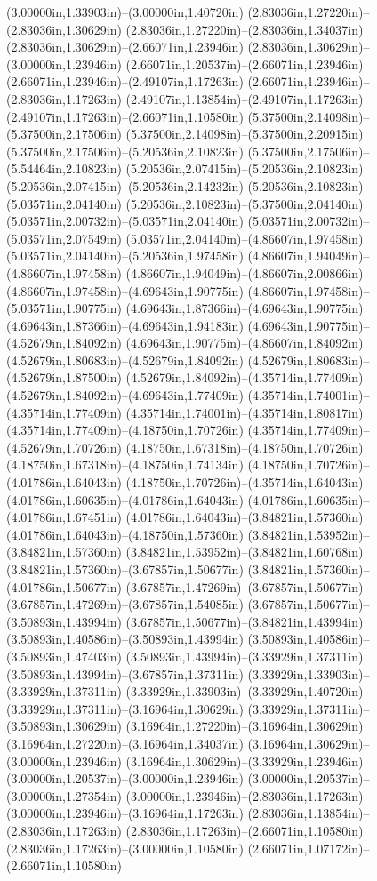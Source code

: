 (3.00000in,1.33903in)--(3.00000in,1.40720in) (2.83036in,1.27220in)--(2.83036in,1.30629in) (2.83036in,1.27220in)--(2.83036in,1.34037in) (2.83036in,1.30629in)--(2.66071in,1.23946in) (2.83036in,1.30629in)--(3.00000in,1.23946in) (2.66071in,1.20537in)--(2.66071in,1.23946in) (2.66071in,1.23946in)--(2.49107in,1.17263in) (2.66071in,1.23946in)--(2.83036in,1.17263in) (2.49107in,1.13854in)--(2.49107in,1.17263in) (2.49107in,1.17263in)--(2.66071in,1.10580in) (5.37500in,2.14098in)--(5.37500in,2.17506in) (5.37500in,2.14098in)--(5.37500in,2.20915in) (5.37500in,2.17506in)--(5.20536in,2.10823in) (5.37500in,2.17506in)--(5.54464in,2.10823in) (5.20536in,2.07415in)--(5.20536in,2.10823in) (5.20536in,2.07415in)--(5.20536in,2.14232in) (5.20536in,2.10823in)--(5.03571in,2.04140in) (5.20536in,2.10823in)--(5.37500in,2.04140in) (5.03571in,2.00732in)--(5.03571in,2.04140in) (5.03571in,2.00732in)--(5.03571in,2.07549in) (5.03571in,2.04140in)--(4.86607in,1.97458in) (5.03571in,2.04140in)--(5.20536in,1.97458in) (4.86607in,1.94049in)--(4.86607in,1.97458in) (4.86607in,1.94049in)--(4.86607in,2.00866in) (4.86607in,1.97458in)--(4.69643in,1.90775in) (4.86607in,1.97458in)--(5.03571in,1.90775in) (4.69643in,1.87366in)--(4.69643in,1.90775in) (4.69643in,1.87366in)--(4.69643in,1.94183in) (4.69643in,1.90775in)--(4.52679in,1.84092in) (4.69643in,1.90775in)--(4.86607in,1.84092in) (4.52679in,1.80683in)--(4.52679in,1.84092in) (4.52679in,1.80683in)--(4.52679in,1.87500in) (4.52679in,1.84092in)--(4.35714in,1.77409in) (4.52679in,1.84092in)--(4.69643in,1.77409in) (4.35714in,1.74001in)--(4.35714in,1.77409in) (4.35714in,1.74001in)--(4.35714in,1.80817in) (4.35714in,1.77409in)--(4.18750in,1.70726in) (4.35714in,1.77409in)--(4.52679in,1.70726in) (4.18750in,1.67318in)--(4.18750in,1.70726in) (4.18750in,1.67318in)--(4.18750in,1.74134in) (4.18750in,1.70726in)--(4.01786in,1.64043in) (4.18750in,1.70726in)--(4.35714in,1.64043in) (4.01786in,1.60635in)--(4.01786in,1.64043in) (4.01786in,1.60635in)--(4.01786in,1.67451in) (4.01786in,1.64043in)--(3.84821in,1.57360in) (4.01786in,1.64043in)--(4.18750in,1.57360in) (3.84821in,1.53952in)--(3.84821in,1.57360in) (3.84821in,1.53952in)--(3.84821in,1.60768in) (3.84821in,1.57360in)--(3.67857in,1.50677in) (3.84821in,1.57360in)--(4.01786in,1.50677in) (3.67857in,1.47269in)--(3.67857in,1.50677in) (3.67857in,1.47269in)--(3.67857in,1.54085in) (3.67857in,1.50677in)--(3.50893in,1.43994in) (3.67857in,1.50677in)--(3.84821in,1.43994in) (3.50893in,1.40586in)--(3.50893in,1.43994in) (3.50893in,1.40586in)--(3.50893in,1.47403in) (3.50893in,1.43994in)--(3.33929in,1.37311in) (3.50893in,1.43994in)--(3.67857in,1.37311in) (3.33929in,1.33903in)--(3.33929in,1.37311in) (3.33929in,1.33903in)--(3.33929in,1.40720in) (3.33929in,1.37311in)--(3.16964in,1.30629in) (3.33929in,1.37311in)--(3.50893in,1.30629in) (3.16964in,1.27220in)--(3.16964in,1.30629in) (3.16964in,1.27220in)--(3.16964in,1.34037in) (3.16964in,1.30629in)--(3.00000in,1.23946in) (3.16964in,1.30629in)--(3.33929in,1.23946in) (3.00000in,1.20537in)--(3.00000in,1.23946in) (3.00000in,1.20537in)--(3.00000in,1.27354in) (3.00000in,1.23946in)--(2.83036in,1.17263in) (3.00000in,1.23946in)--(3.16964in,1.17263in) (2.83036in,1.13854in)--(2.83036in,1.17263in) (2.83036in,1.17263in)--(2.66071in,1.10580in) (2.83036in,1.17263in)--(3.00000in,1.10580in) (2.66071in,1.07172in)--(2.66071in,1.10580in) 